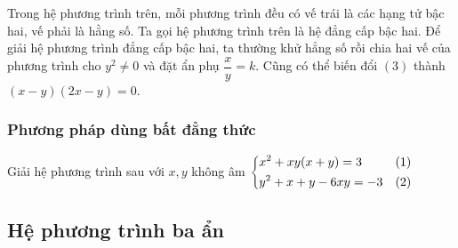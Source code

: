 \begin{note}
Trong hệ phương trình trên, mỗi phương trình đều có vế trái là các hạng tử bậc hai, vế phải là hằng số. Ta gọi hệ phương trình trên là hệ đẳng cấp bậc hai.
Để giải hệ phương trình đẳng cấp bậc hai, ta thường khử hẳng số rồi chia hai vế của phương trình cho $y^2\neq 0$ và đặt ẩn phụ $\dfrac{x}{y}=k$. Cũng có thể biến đổi $(3)$ thành $(x-y)(2x-y)=0$.
\end{note}


\subsubsection{Phương pháp dùng bất đẳng thức}
\begin{vd}
Giải hệ phương trình sau với $x, y$ không âm $\left\{\begin{aligned}&x^2+xy(x+y)=3&(1)\\&y^2+x+y-6xy=-3&(2)\end{aligned}\right.$
\end{vd}

\subsection{Hệ phương trình ba ẩn}

